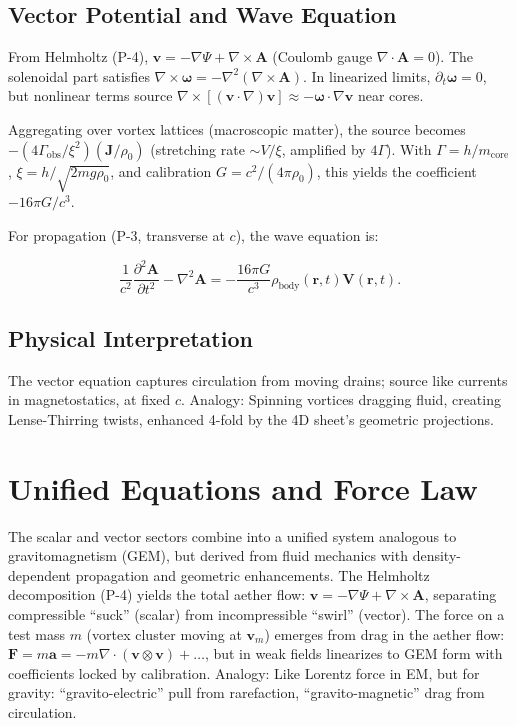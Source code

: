 \documentclass{article}
\begin{document}
\subsection{Vector Potential and Wave Equation}

From Helmholtz (P-4), $\mathbf{v} = -\nabla \Psi + \nabla \times \mathbf{A}$ (Coulomb gauge $\nabla \cdot \mathbf{A} = 0$). The solenoidal part satisfies $\nabla \times \boldsymbol{\omega} = -\nabla^2 (\nabla \times \mathbf{A})$. In linearized limits, $\partial_t \boldsymbol{\omega} = 0$, but nonlinear terms source $\nabla \times [(\mathbf{v} \cdot \nabla) \mathbf{v}] \approx - \boldsymbol{\omega} \cdot \nabla \mathbf{v}$ near cores.

Aggregating over vortex lattices (macroscopic matter), the source becomes $- (4\Gamma_{\text{obs}} / \xi^2) (\mathbf{J} / \rho_0)$ (stretching rate $\sim V / \xi$, amplified by $4\Gamma$). With $\Gamma = h / m_{\text{core}}$, $\xi = h / \sqrt{2 m g \rho_0}$, and calibration $G = c^2 / (4\pi \rho_0)$, this yields the coefficient $-16\pi G / c^3$.

For propagation (P-3, transverse at $c$), the wave equation is:

\[
\frac{1}{c^2} \frac{\partial^2 \mathbf{A}}{\partial t^2} - \nabla^2 \mathbf{A} = -\frac{16\pi G}{c^3} \rho_{\text{body}}(\mathbf{r}, t) \mathbf{V}(\mathbf{r}, t).
\]

\subsection{Physical Interpretation}

The vector equation captures circulation from moving drains; source like currents in magnetostatics, at fixed $c$. Analogy: Spinning vortices dragging fluid, creating Lense-Thirring twists, enhanced 4-fold by the 4D sheet's geometric projections.

\section{Unified Equations and Force Law}

The scalar and vector sectors combine into a unified system analogous to gravitomagnetism (GEM), but derived from fluid mechanics with density-dependent propagation and geometric enhancements. The Helmholtz decomposition (P-4) yields the total aether flow: $\mathbf{v} = -\nabla \Psi + \nabla \times \mathbf{A}$, separating compressible ``suck'' (scalar) from incompressible ``swirl'' (vector). The force on a test mass $m$ (vortex cluster moving at $\mathbf{v}_m$) emerges from drag in the aether flow: $\mathbf{F} = m \mathbf{a} = -m \nabla \cdot (\mathbf{v} \otimes \mathbf{v}) + \dots$, but in weak fields linearizes to GEM form with coefficients locked by calibration. Analogy: Like Lorentz force in EM, but for gravity: ``gravito-electric'' pull from rarefaction, ``gravito-magnetic'' drag from circulation.
\end{document}
